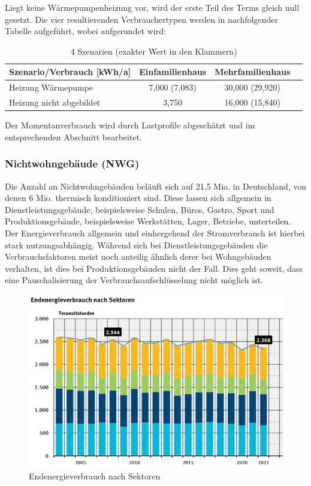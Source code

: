Liegt keine Wärmepumpenheizung vor, wird der erste Teil des Terms gleich null gesetzt. 
Die vier resultierenden Verbrauchertypen werden in nachfolgender Tabelle aufgeführt, wobei aufgerundet wird:

\begin{table}[htbp]
    \centering
    \caption{4 Szenarien (exakter Wert in den Klammern)}
    \label{tab:szenarien}
    \begin{tabular}{lccc}
        \toprule
        \textbf{Szenario/Verbrauch [kWh/a]} & \textbf{Einfamilienhaus} & \textbf{Mehrfamilienhaus} \\
        \midrule
        Heizung Wärmepumpe & 7,000 (7,083) & 30,000 (29,920) \\
        Heizung nicht abgebildet & 3,750 & 16,000 (15,840) \\
        \bottomrule
    \end{tabular}
\end{table}

Der Momentanverbrauch wird durch Lastprofile abgeschätzt und im entsprechenden Abschnitt bearbeitet.

\subsubsection{Nichtwohngebäude (NWG)}

Die Anzahl an Nichtwohngebäuden beläuft sich auf 21,5 Mio. in Deutschland, von denen 6 Mio. thermisch konditioniert sind. 
Diese lassen sich allgemein in Dienstleistungsgebäude, beispielsweise Schulen, Büros, Gastro, Sport und Produktionsgebäude, beispielsweise Werkstätten, Lager, Betriebe, unterteilen. 
Der Energieverbrauch allgemein und einhergehend der Stromverbrauch ist hierbei stark nutzungsabhängig. 
Während sich bei Dienstleistungsgebäuden die Verbrauchsfaktoren meist noch anteilig ähnlich derer bei Wohngebäuden verhalten, ist dies bei Produktionsgebäuden nicht der Fall. 
Dies geht soweit, dass eine Pauschalisierung der Verbrauchsaufschlüsselung nicht möglich ist.

\begin{figure}[h!]
    \centering
    \includegraphics[width=14cm]{Abbildungen/VerbraucherAbb3.jpg}
    \caption{Endenergieverbrauch nach Sektoren\cite{uwb}}\label{fig:Endenergieverbrauch_nach_Sektoren}
\end{figure}

